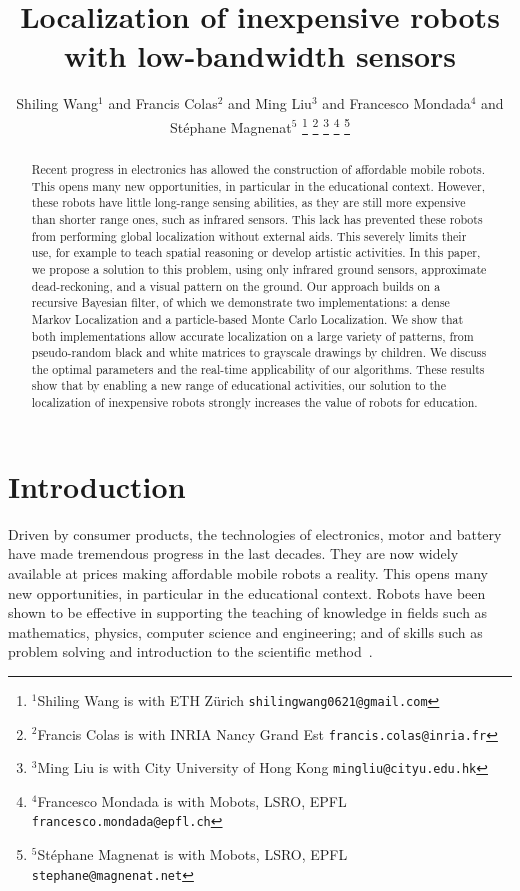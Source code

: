 \documentclass[letterpaper, 10pt, conference]{ieeeconf}
\title{\LARGE \bf
Localization of inexpensive robots with low-bandwidth sensors
}
\author{Shiling Wang$^{1}$ and Francis Colas$^{2}$ and Ming Liu$^{3}$ and Francesco Mondada$^{4}$ and Stéphane Magnenat$^{5}$%
\thanks{$^{1}$Shiling Wang is with ETH Zürich
        {\tt\small shilingwang0621@gmail.com}}%
\thanks{$^{2}$Francis Colas is with INRIA Nancy Grand Est
        {\tt\small francis.colas@inria.fr}}%
\thanks{$^{3}$Ming Liu is with City University of Hong Kong
        {\tt\small mingliu@cityu.edu.hk}}%
\thanks{$^{4}$Francesco Mondada is with Mobots, LSRO, EPFL
        {\tt\small francesco.mondada@epfl.ch}}%
\thanks{$^{5}$Stéphane Magnenat is with Mobots, LSRO, EPFL
        {\tt\small stephane@magnenat.net}}%
}
\begin{document}
\maketitle
\thispagestyle{empty}
\pagestyle{empty}

\begin{abstract}
Recent progress in electronics has allowed the construction of affordable mobile robots.
This opens many new opportunities, in particular in the educational context.
However, these robots have little long-range sensing abilities, as they are still more expensive than shorter range ones, such as infrared sensors.
This lack has prevented these robots from performing global localization without external aids.
This severely limits their use, for example to teach spatial reasoning or develop artistic activities.
In this paper, we propose a solution to this problem, using only infrared ground sensors, approximate dead-reckoning, and a visual pattern on the ground.
Our approach builds on a recursive Bayesian filter, of which we demonstrate two implementations: a dense Markov Localization and a particle-based Monte Carlo Localization.
We show that both implementations allow accurate localization on a large variety of patterns, from pseudo-random black and white matrices to grayscale drawings by children.
We discuss the optimal parameters and the real-time applicability of our algorithms.
These results show that by enabling a new range of educational activities, our solution to the localization of inexpensive robots strongly increases the value of robots for education.

\end{abstract}

\section{Introduction}

Driven by consumer products, the technologies of electronics, motor and battery have made tremendous progress in the last decades.
They are now widely available at prices making affordable mobile robots a reality.
This opens many new opportunities, in particular in the educational context.
Robots have been shown to be effective in supporting the teaching of knowledge in fields such as mathematics, physics, computer science and engineering; and of skills such as problem solving and introduction to the scientific method~\cite{benitti2012explorin}.
\end{document}
